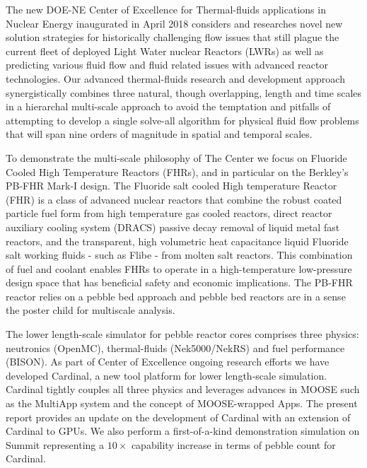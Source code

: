 
The new DOE-NE Center of Excellence for Thermal-fluids applications in Nuclear Energy inaugurated in April 2018 considers and researches novel new solution strategies for historically challenging flow issues that still plague the current fleet of deployed Light Water nuclear Reactors (LWRs) as well as predicting various fluid flow and fluid related issues with advanced reactor technologies. 
Our advanced thermal-fluids research and development approach synergistically combines three natural, though overlapping, length and time scales in a hierarchal multi-scale approach to avoid the temptation and pitfalls of attempting to develop a single solve-all algorithm for physical fluid flow problems that will span nine orders of magnitude in spatial and temporal scales.

To demonstrate the multi-scale philosophy of The Center we focus on Fluoride Cooled High Temperature Reactors (FHRs), and in particular on the Berkley's PB-FHR Mark-I design. 
The Fluoride salt cooled High temperature Reactor (FHR) is a class of advanced nuclear reactors that combine the robust coated particle fuel form from high temperature gas cooled reactors, direct reactor auxiliary cooling system (DRACS) passive decay removal of liquid metal fast reactors, and the transparent, high volumetric heat capacitance liquid Fluoride salt working fluids - such as Flibe - from molten salt reactors. 
This combination of fuel and coolant enables FHRs to operate in a high-temperature low-pressure design space that has beneficial safety and economic implications. 
The PB-FHR reactor relies on a pebble bed approach and pebble bed reactors are in a sense the poster child for multiscale analysis.

The lower length-scale simulator for pebble reactor cores comprises three physics: neutronics (OpenMC), thermal-fluids (Nek5000/NekRS) and fuel performance (BISON). 
As part of Center of Excellence ongoing research efforts we have developed Cardinal, a new tool platform for lower length-scale simulation. 
Cardinal tightly couples all three physics and leverages advances in MOOSE such as the MultiApp system and the concept of MOOSE-wrapped Apps. 
The present report provides an update on the development of Cardinal with an extension of Cardinal to GPUs. 
We also perform a first-of-a-kind demonstration simulation on Summit representing a $10\times$ capability increase in terms of pebble count for Cardinal.
